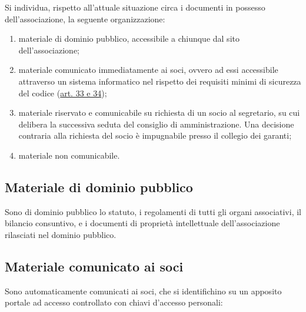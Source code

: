 Si individua, rispetto all'attuale situazione circa i documenti in
possesso dell'associazione, la seguente organizzazione:

\begin{enumerate}
    \item
        materiale di dominio pubblico, accessibile a chiunque dal sito
        dell'associazione;
    \item
        materiale comunicato immediatamente ai soci, ovvero ad essi
        accessibile attraverso un sistema informatico nel rispetto dei
        requisiti minimi di sicurezza del codice
        (\href{http://www.garanteprivacy.it/web/guest/home/docweb/-/docweb-display/docweb/1311248}{art.
        33 e 34});
    \item
        materiale riservato e comunicabile su richiesta di un socio al
        segretario, su cui delibera la successiva seduta del consiglio di
        amministrazione. Una decisione contraria alla richiesta del socio è
        impugnabile presso il collegio dei garanti;
    \item
        materiale non comunicabile.
\end{enumerate}

\subsection{Materiale di dominio pubblico}\label{materiale-di-dominio-pubblico}

Sono di dominio pubblico lo statuto, i regolamenti di tutti gli organi
associativi, il bilancio consuntivo, e i documenti di proprietà
intellettuale dell'associazione rilasciati nel dominio pubblico.

\subsection{Materiale comunicato ai soci}\label{materiale-comunicato-ai-soci}

Sono automaticamente comunicati ai soci, che si identifichino su un apposito portale ad
accesso controllato con chiavi d'accesso personali:

